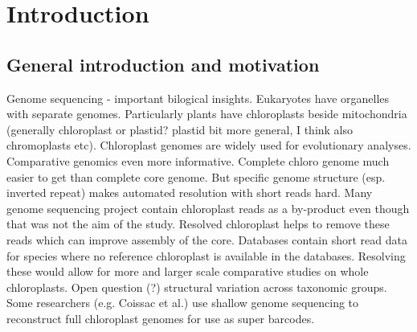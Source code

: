 \documentclass{bmcart}
\begin{document}


\section*{Introduction}
\subsection*{General introduction and motivation}
Genome sequencing - important bilogical insights.
Eukaryotes have organelles with separate genomes.
Particularly plants have chloroplasts beside mitochondria (generally chloroplast or plastid? plastid bit more general, I think also chromoplasts etc).
Chloroplast genomes are widely used for evolutionary analyses.
Comparative genomics even more informative.
Complete chloro genome much easier to get than complete core genome.
But specific genome structure (esp. inverted repeat) makes automated resolution with short reads hard.
Many genome sequencing project contain chloroplast reads as a by-product even though that was not the aim of the study.
Resolved chloroplast helps to remove these reads which can improve assembly of the core.
Databases contain short read data for species where no reference chloroplast is available in the databases.
Resolving these would allow for more and larger scale comparative studies on whole chloroplasts.
Open question (?) structural variation across taxonomic groups.
Some researchers (e.g. Coissac et al.) use shallow genome sequencing to reconstruct full chloroplast genomes for use as super barcodes.
\end{document}
